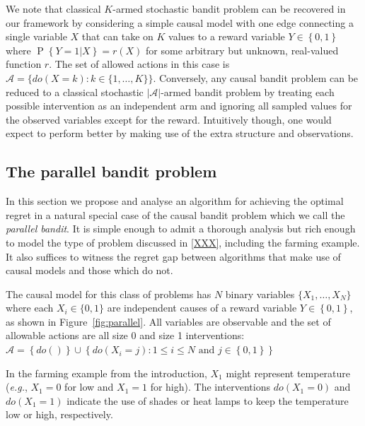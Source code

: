 \documentclass[11pt,a4paper,oneside]{book}
\newcommand{\eg}{\textit{e.g.}}
\newcommand{\set}[1]{\left\{#1\right\}}
\renewcommand{\P}[1]{\operatorname{P}\left\{#1\right\}}
\begin{document}
We note that classical $K$-armed stochastic bandit problem can be recovered in our framework by considering a simple causal model with one edge connecting a single variable $X$ that can take on $K$ values to a reward variable $Y \in \set{0,1}$ where $\P{Y = 1|X} = r(X)$ for some arbitrary but unknown, real-valued function $r$. The set of allowed actions in this case is $\mathcal{A} = \{ do(X = k) \colon k \in \{1, \ldots, K\}\}$. Conversely, any causal bandit problem can be reduced to a classical stochastic $|\mathcal{A}|$-armed bandit problem by treating each possible intervention as an independent arm and ignoring all sampled values for the observed variables except for the reward. Intuitively though, one would expect to perform better by making use of the extra structure and observations.


\subsection*{The parallel bandit problem}

In this section we propose and analyse an algorithm for achieving the optimal regret in a natural special case of the causal bandit problem which we call the {\it parallel bandit}.
It is simple enough to admit a thorough analysis but rich enough to model the type of problem discussed in \ref{XXX}, including the farming example. It also suffices to witness the regret gap between algorithms that make use of causal models and those which do not.

The causal model for this class of problems has $N$ binary variables $\{ X_1, \ldots, X_N \}$ where each $X_i \in \{0,1\}$ are independent causes of a reward variable $Y \in \set{0,1}$, as shown in Figure~\ref{fig:parallel}. All variables are observable and the set of allowable actions are all size 0 and size 1 interventions: $\mathcal{A} = \set{do()} \cup \set{ do(X_i = j) \colon 1 \leq i \leq N \text{ and } j \in \set{0,1}}$

In the farming example from the introduction, $X_1$ might represent temperature (\eg, $X_1=0$ for low and $X_1=1$ for high). The interventions $do(X_1 = 0)$ and $do(X_1 = 1)$ indicate the use of shades or heat lamps to keep the temperature low or high, respectively.
\end{document}
